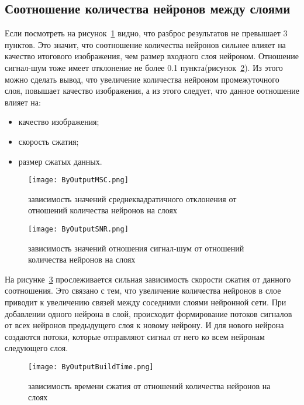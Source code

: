 \subsection{Соотношение количества нейронов между слоями}
\label{sub:analysis:output}

Если посмотреть на рисунок~\ref{fig:by_output_msc} видно, что разброс результатов не превышает 3 пунктов. Это значит, что соотношение количества нейронов
сильнее влияет на качество итогового изображения, чем размер входного слоя нейроном. Отношение сигнал-шум тоже имеет отклонение не более 0.1 пункта(рисунок~\ref{fig:by_output_snr}).
Из этого можно сделать вывод, что увеличение количества нейроном промежуточного слоя, повышает качество изображения, а из этого следует, что данное оотношение влияет на:
\begin{itemize}
  \item качество изображения;
  \item скорость сжатия;
  \item размер сжатых данных.
\end{itemize}

\begin{figure}[ht]
\centering
  \texttt{[image: ByOutputMSC.png]}
  \caption{ зависимость значений среднеквадратичного отклонения от отношений количества нейронов на слоях }
  \label{fig:by_output_msc}
\end{figure}

\begin{figure}[ht]
\centering
  \texttt{[image: ByOutputSNR.png]}
  \caption{ зависимость значений отношения сигнал-шум от отношений количества нейронов на слоях }
  \label{fig:by_output_snr}
\end{figure}

На рисунке~\ref{fig:by_output_build_time} прослеживается сильная зависимость скорости сжатия от данного соотношения.
Это связано с тем, что увеличение количества нейронов в слое приводит к увеличению связей между соседними слоями нейронной сети.
При добавлении одного нейрона в слой, происходит формирование потоков сигналов от всех нейронов предыдущего слоя к новому нейрону.
И для нового нейрона создаются потоки, которые отправляют сигнал от него ко всем нейронам следующего слоя.

\begin{figure}[ht]
\centering
  \texttt{[image: ByOutputBuildTime.png]}
  \caption{ зависимость времени сжатия от отношений количества нейронов на слоях }
  \label{fig:by_output_build_time}
\end{figure}


